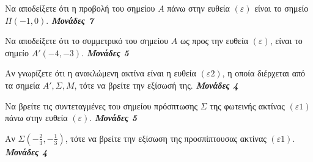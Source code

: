 \documentclass[11pt,a4paper,twoside]{book}
\newcommand{\monades}[1]{
\hspace*{\fill}
\textbf{\textit{\textcolor{maincolor}{Μονάδες #1}}}}
\begin{document}
\begin{center}
\end{center}

\begin{alist}
\item[α)]
    \begin{rlist}        \item Να αποδείξετε ότι η προβολή του σημείου $A$ πάνω στην ευθεία $(\varepsilon)$ είναι το σημείο $\Pi(-1,0)$. \monades{7}
        \item Να αποδείξετε ότι το συμμετρικό του σημείου $A$ ως προς την ευθεία $(\varepsilon)$, είναι το σημείο $A'(-4, -3)$. \monades{5}\end{rlist}
\item[β)]
    \begin{rlist}        \item Αν γνωρίζετε ότι η ανακλώμενη ακτίνα είναι η ευθεία $(\varepsilon2)$, η οποία διέρχεται από τα σημεία $A', \Sigma, M$, τότε να βρείτε την εξίσωσή της. \monades{4}
        \item Να βρείτε τις συντεταγμένες του σημείου πρόσπτωσης $\Sigma$ της φωτεινής ακτίνας $(\varepsilon1)$ πάνω στην ευθεία $(\varepsilon)$. \monades{5}\end{rlist}
\item[γ)] Αν $\Sigma\left(-\frac{2}{3}, -\frac{1}{3}\right)$, τότε να βρείτε την εξίσωση της προσπίπτουσας ακτίνας $(\varepsilon1)$. \monades{4}
\end{alist}
\end{document}
